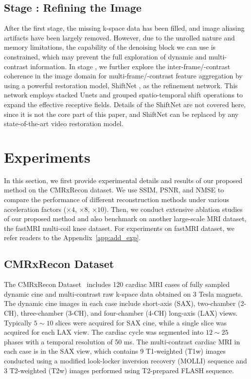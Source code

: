 \documentclass[runningheads]{llncs}
\newcommand{\RNum}[1]{\uppercase\expandafter{\romannumeral #1\relax}}
\begin{document}
\subsection{Stage \RNum{2}: Refining the Image}
After the first stage, the missing k-space data has been filled, and image aliasing artifacts have been largely removed. However, due to the unrolled nature and memory limitations, the capability of the denoising block we can use is constrained, which may prevent the full exploration of dynamic and multi-contrast information. In stage \RNum{2}, we further explore the inter-frame/-contrast coherence in the image domain for multi-frame/-contrast feature aggregation by using a powerful restoration model, ShiftNet \cite{li2023simple}, as the refinement network. This network employs stacked Unets and grouped spatio-temporal shift operations to expand the effective receptive fields. Details of the ShiftNet are not covered here, since it is not the core part of this paper, and ShiftNet can be replaced by any state-of-the-art video restoration model. 
\section{Experiments}
In this section, we first provide experimental details and results of our proposed method on the CMRxRecon dataset.
We use SSIM, PSNR, and NMSE to compare the performance of different reconstruction methods under various acceleration factors ($\times 4$, $\times 8$, $\times 10$). Then, we conduct extensive ablation studies of our proposed method and also benchmark on another large-scale MRI dataset, the fastMRI multi-coil knee dataset. For experiments on fastMRI dataset, we refer readers to the Appendix~\ref{app:add_exp}.

\subsection{CMRxRecon Dataset}
The CMRxRecon Dataset~\cite{wang2023cmrxrecon} includes 120 cardiac MRI cases of fully sampled dynamic cine and multi-contrast raw k-space data obtained on 3 Tesla magnets. The dynamic cine images in each case include short-axis (SAX), two-chamber (2-CH), three-chamber (3-CH), and four-chamber (4-CH) long-axis (LAX) views. Typically $5\sim10$ slices were acquired for SAX cine, while a single slice was acquired for each LAX view. The cardiac cycle was segmented into $12\sim25$ phases with a temporal resolution of 50 ms. The multi-contrast cardiac MRI in each case is in the SAX view, which contains 9 T1-weighted (T1w) images conducted using a modified look-locker inversion recovery (MOLLI) sequence and 3 T2-weighted (T2w) images performed using T2-prepared FLASH sequence. 
\end{document}
